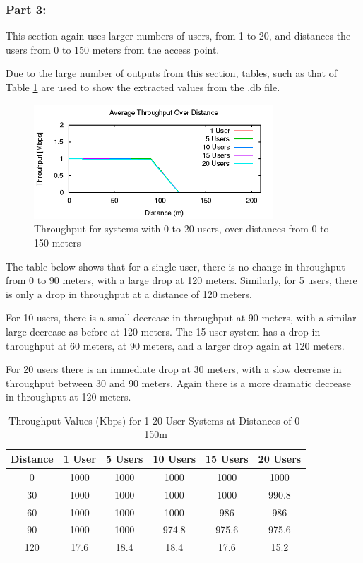 \subsubsection{Part 3:}

This section again uses larger numbers of users, from 1 to 20, and distances the
users from 0 to 150 meters from the access point.

Due to the large number of outputs from this section, tables, such as that of
Table \ref{tab:QCP3TPTable} are used to show the extracted values from the .db
file.
\begin{figure}[H]
	\centering
	\includegraphics[width=0.8\textwidth]{images/EE500/QC/P3/Images/wifi-throughput}
	\caption{Throughput for systems with 0 to 20 users, over distances from
	0 to 150 meters}
	\label{fig:QCP3throughput}
\end{figure}

The table below shows that for a single user, there is no change in throughput
from 0 to 90 meters, with a large drop at 120 meters. Similarly, for 5 users,
there is only a drop in throughput at a distance of 120 meters.
\par For 10 users,
there is a small decrease in throughput at 90 meters, with a similar large
decrease as before at 120 meters. The 15 user system has a drop in throughput at
60 meters, at 90 meters, and a larger drop again at 120 meters.
\par For 20 users there is an immediate drop at 30 meters, with a slow decrease
in throughput between 30 and 90 meters. Again there is a more dramatic decrease
in throughput at 120 meters.

\begin{table}[H]
	\centering
	\caption{Throughput Values (Kbps) for 1-20 User Systems at Distances of 0-150m}
	\label{tab:QCP3TPTable}
	\begin{tabular}{|c|c|c|c|c|c|}
		\hline
		Distance & 1 User & 5 Users & 10 Users & 15 Users & 20 Users\\
		\hline
		0 & 1000 & 1000 & 1000 & 1000 & 1000\\
		30 & 1000 & 1000 & 1000 & 1000 & 990.8\\
		60 & 1000 & 1000 & 1000 & 986 & 986\\
		90 & 1000 & 1000 & 974.8 & 975.6 & 975.6\\
		120 & 17.6 & 18.4 & 18.4 & 17.6 & 15.2\\
		\hline
	\end{tabular}
\end{table}

